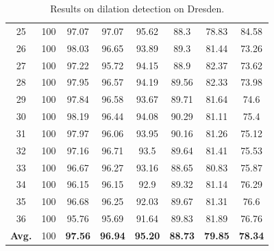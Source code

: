 \documentclass[review]{elsarticle}
\begin{document}
\begin{table}[ht!]
\begin{minipage}{0.48\linewidth}
{\begin{tabular}{c|ccccccc}
				25&100&97.07&97.07&95.62&88.3&78.83&84.58\\
				26&100&98.03&96.65&93.89&89.3&81.44&73.26\\
				27&100&97.22&95.72&94.15&88.9&82.37&73.62\\
				28&100&97.95&96.57&94.19&89.56&82.33&73.98\\
				29&100&97.84&96.58&93.67&89.71&81.64&74.6\\
				30&100&98.19&96.44&94.08&90.29&81.11&75.4\\
				31&100&97.97&96.06&93.95&90.16&81.26&75.12\\
				32&100&97.16&96.71&93.5&89.64&81.41&75.53\\
				33&100&96.67&96.27&93.16&88.65&80.83&75.87\\
				34&100&96.15&96.15&92.9&89.32&81.14&76.29\\
				35&100&96.68&96.25&92.03&89.67&81.31&76.6\\
				36&100&95.76&95.69&91.64&89.83&81.89&76.76\\
				\hline
				\textbf{Avg.}&100&\textbf{97.56}&\textbf{96.94}&\textbf{95.20}&\textbf{88.73}&\textbf{79.85}&\textbf{78.34}\\
				\hline\hline	
		\end{tabular}}
	\end{minipage}
	\begin{minipage}{0.48\linewidth}
		\centering
		\caption{Results on dilation detection on Dresden.}
		\label{table:dresdendilation}
\end{minipage}
\end{table}
\end{document}
